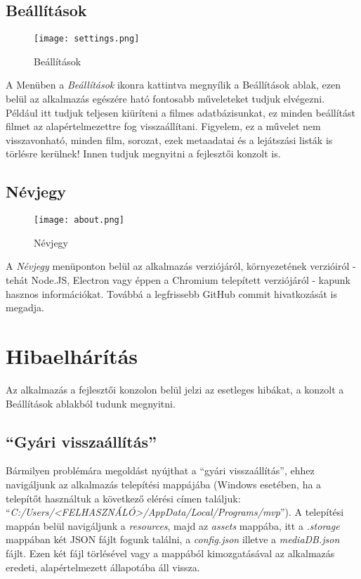\subsection{Beállítások}
\begin{figure}[H]
	\centering
	\texttt{[image: settings.png]}
	\caption{Beállítások}
	\label{fig:settings}
\end{figure}
A Menüben a {\it Beállítások} ikonra kattintva megnyílik a Beállítások ablak, ezen belül az alkalmazás egészére ható fontosabb műveleteket tudjuk elvégezni. Például itt tudjuk teljesen kiüríteni a filmes adatbázisunkat, ez minden beállítást filmet az alapértelmezettre fog visszaállítani. Figyelem, ez a művelet nem visszavonható, minden film, sorozat, ezek metaadatai és a lejátszási listák is törlésre kerülnek!
Innen tudjuk megnyitni a fejlesztői konzolt is.

\subsection{Névjegy}
\begin{figure}[H]
	\centering
	\texttt{[image: about.png]}
	\caption{Névjegy}
	\label{fig:about}
\end{figure}
A {\it Névjegy} menüponton belül az alkalmazás verziójáról, környezetének verzióiról - tehát Node.JS, Electron vagy éppen a Chromium telepített verziójáról - kapunk hasznos információkat. Továbbá a legfrissebb GitHub commit hivatkozását is megadja.

\cleardoublepage
\section{Hibaelhárítás}
Az alkalmazás a fejlesztői konzolon belül jelzi az esetleges hibákat, a konzolt a Beállítások ablakból tudunk megnyitni.

\subsection{``Gyári visszaállítás''}
Bármilyen problémára megoldást nyújthat a ``gyári visszaállítás'', ehhez navigáljunk az alkalmazás telepítési mappájába (Windows esetében, ha a telepítőt használtuk a következő elérési címen találjuk: ``{\it C:/Users/<FELHASZNÁLÓ>/AppData/Local/Programs/mvp}''). A telepítési mappán belül navigáljunk a {\it resources}, majd az {\it assets} mappába, itt a {\it .storage} mappában két JSON fájlt fogunk találni, a {\it config.json} illetve a {\it mediaDB.json} fájlt. Ezen két fájl törlésével vagy a mappából kimozgatásával az alkalmazás eredeti, alapértelmezett állapotába áll vissza.

